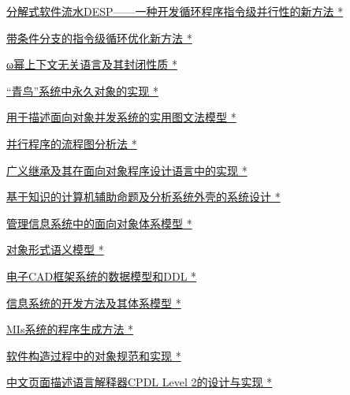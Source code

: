 \documentclass[a4paper]{article}
\begin{document}
\href{http://www.jos.org.cn/ch/reader/download_pdf.aspx?file_no=1995s120&year_id=1995&quarter_id=zk&falg=1}{分解式软件流水DESP——一种开发循环程序指令级并行性的新方法 *}

\href{http://www.jos.org.cn/ch/reader/download_pdf.aspx?file_no=1995s121&year_id=1995&quarter_id=zk&falg=1}{带条件分支的指令级循环优化新方法 *}

\href{http://www.jos.org.cn/ch/reader/download_pdf.aspx?file_no=1995s122&year_id=1995&quarter_id=zk&falg=1}{ω幂上下文无关语言及其封闭性质 *}

\href{http://www.jos.org.cn/ch/reader/download_pdf.aspx?file_no=1995s123&year_id=1995&quarter_id=zk&falg=1}{“青鸟”系统中永久对象的实现 *}

\href{http://www.jos.org.cn/ch/reader/download_pdf.aspx?file_no=1995s124&year_id=1995&quarter_id=zk&falg=1}{用于描述面向对象并发系统的实用图文法模型 *}

\href{http://www.jos.org.cn/ch/reader/download_pdf.aspx?file_no=1995s125&year_id=1995&quarter_id=zk&falg=1}{并行程序的流程图分析法 *}

\href{http://www.jos.org.cn/ch/reader/download_pdf.aspx?file_no=1995s126&year_id=1995&quarter_id=zk&falg=1}{广义继承及其在面向对象程序设计语言中的实现 *}

\href{http://www.jos.org.cn/ch/reader/download_pdf.aspx?file_no=1995s127&year_id=1995&quarter_id=zk&falg=1}{基于知识的计算机辅助命题及分析系统外壳的系统设计 *}

\href{http://www.jos.org.cn/ch/reader/download_pdf.aspx?file_no=1995s128&year_id=1995&quarter_id=zk&falg=1}{管理信息系统中的面向对象体系模型 *}

\href{http://www.jos.org.cn/ch/reader/download_pdf.aspx?file_no=1995s129&year_id=1995&quarter_id=zk&falg=1}{对象形式语义模型 *}

\href{http://www.jos.org.cn/ch/reader/download_pdf.aspx?file_no=1995s130&year_id=1995&quarter_id=zk&falg=1}{电子CAD框架系统的数据模型和DDL *}

\href{http://www.jos.org.cn/ch/reader/download_pdf.aspx?file_no=1995s131&year_id=1995&quarter_id=zk&falg=1}{信息系统的开发方法及其体系模型 *}

\href{http://www.jos.org.cn/ch/reader/download_pdf.aspx?file_no=1995s132&year_id=1995&quarter_id=zk&falg=1}{MIs系统的程序生成方法 *}

\href{http://www.jos.org.cn/ch/reader/download_pdf.aspx?file_no=1995s133&year_id=1995&quarter_id=zk&falg=1}{软件构造过程中的对象规范和实现 *}

\href{http://www.jos.org.cn/ch/reader/download_pdf.aspx?file_no=1995s134&year_id=1995&quarter_id=zk&falg=1}{中文页面描述语言解释器CPDL Level 2的设计与实现 *}
\end{document}
